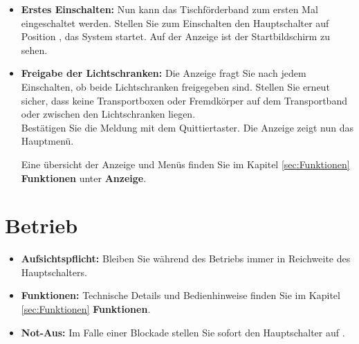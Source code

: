 \begin{itemize}
	\item \textbf{Erstes Einschalten: } Nun kann das Tischförderband zum ersten Mal eingeschaltet werden.
	Stellen Sie zum Einschalten den Hauptschalter auf Position , das System startet.
	Auf der Anzeige ist der Startbildschirm zu sehen. 
	
	\item \textbf{Freigabe der Lichtschranken:} Die Anzeige fragt Sie nach jedem Einschalten, ob beide Lichtschranken freigegeben sind. Stellen Sie erneut sicher, dass keine Transportboxen oder Fremdkörper auf dem Transportband oder zwischen den Lichtschranken liegen.\\
	Bestätigen Sie die Meldung mit dem Quittiertaster. Die Anzeige zeigt nun das Hauptmenü.
	
	Eine übersicht der Anzeige und Menüs finden Sie im Kapitel \ref{sec:Funktionen} \textbf{Funktionen} unter \textbf{Anzeige}.
	
\end{itemize}



\section{Betrieb}

\begin{itemize}
	\item \textbf{Aufsichtspflicht:} Bleiben Sie während des Betriebs immer in Reichweite des Hauptschalters.
	
	\item \textbf{Funktionen:} Technische Details und Bedienhinweise finden Sie im Kapitel \ref{sec:Funktionen} \textbf{Funktionen}.
	
	\item \textbf{Not-Aus:} Im Falle einer Blockade stellen Sie sofort den Hauptschalter auf .
	
\end{itemize}
